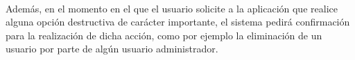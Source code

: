   \paragraph{}Además, en el momento en el que el usuario solicite a la
  aplicación que realice alguna opción destructiva de carácter importante, el
  sistema pedirá confirmación para la realización de dicha acción, como por
  ejemplo la eliminación de un usuario por parte de algún usuario administrador.
